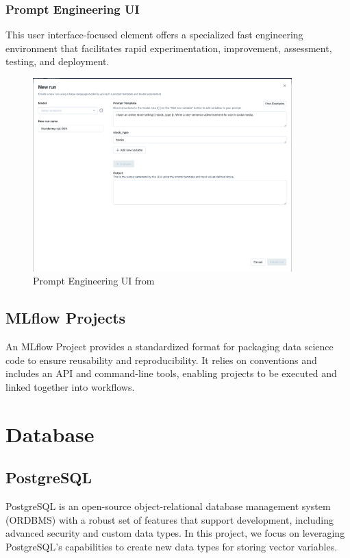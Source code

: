         \subsubsection{Prompt Engineering UI}
        This user interface-focused element offers a specialized fast engineering environment that facilitates rapid experimentation, improvement, assessment, testing, and deployment.
        \begin{figure}[H]
            \centering
            \includegraphics[width=10cm]{chapters/2/figures/prompt_modal_1-51ecbda29dcb90d4b7ed59a996470b87.png}
            \caption[Prompt Engineering UI]{Prompt Engineering UI  from~\cite{mlflow}}
            \label{fig:mlflow-prompt-engineering-ui}
        \end{figure}
        \subsection{MLflow Projects}
        An MLflow Project provides a standardized format for packaging data science code to ensure reusability and reproducibility. It relies on conventions and includes an API and command-line tools, enabling projects to be executed and linked together into workflows.

\pagebreak
\section{Database}
    \subsection{PostgreSQL}
    PostgreSQL is an open-source object-relational database management system (ORDBMS) with a robust set of features that support development, including advanced security and custom data types. In this project, we focus on leveraging PostgreSQL's capabilities to create new data types for storing vector variables.
